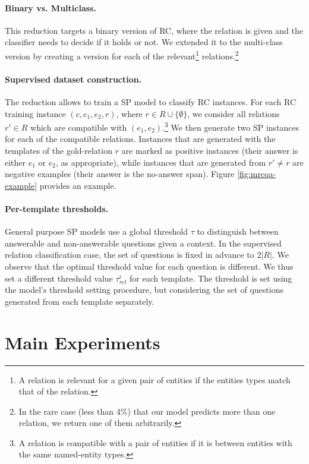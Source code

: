 \documentclass[11pt]{article}
\begin{document}
\paragraph{Binary vs. Multiclass.} This reduction targets a binary version of RC, where the relation is given and the classifier needs to decide if it holds or not. We extended it to the multi-class version by creating a version for each of the relevant\footnote{A relation is relevant for a given pair of entities if the entities types match that of the relation.} relations.\footnote{In the rare case (less than 4\%) that our model predicts more than one relation, we return one of them arbitrarily.}
\paragraph{Supervised dataset construction.}
The reduction allows to train a SP model to classify RC instances. For each RC training instance $(c, e_1, e_2, r)$, where $r \in R\cup\{\emptyset\}$, we consider all relations $r' \in R$ which are compatible with $(e_1, e_2)$.\footnote{A relation is compatible with a pair of entities if it is between entities with the same named-entity types.}
We then generate two SP instances for each of the compatible relations. Instances that are generated with the templates of the gold-relation $r$ are marked as positive instances (their answer is either $e_1$ or $e_2$, as appropriate), while instances that are generated from $r' \neq r$ are negative examples (their answer is the no-answer span). Figure \ref{fig:mrcqa-example} provides an example.


\paragraph{Per-template thresholds.}
General purpose SP models use a global threshold $\tau$ to distinguish between answerable and non-answerable questions given a context. 
In the supervised relation classification case, the set of questions is fixed in advance to $2|R|$. We observe that the optimal threshold value for each question is different. We thus set a different threshold value $\tau^i_{rel}$ for each template. The threshold is set using the model’s threshold setting procedure, but considering the set of questions generated from each template separately.

\section{Main Experiments} \label{sec:experements}
\end{document}
